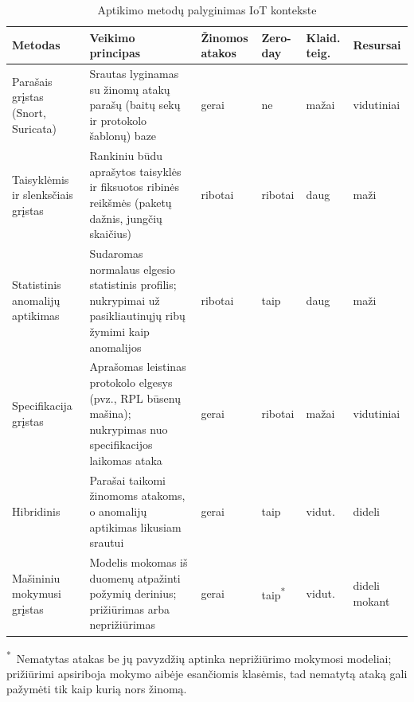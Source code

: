 \begin{table}[htbp]
\centering
\caption{Aptikimo metodų palyginimas IoT kontekste}
\label{tab:aptikimas}
\footnotesize
\setlength{\tabcolsep}{4pt}
\begin{tabularx}{\textwidth}{@{}
  >{\raggedright\arraybackslash}p{2.1cm}
  >{\raggedright\arraybackslash}X
  >{\centering\arraybackslash}p{1.5cm}
  >{\centering\arraybackslash}p{1.4cm}
  >{\centering\arraybackslash}p{1.5cm}
  >{\centering\arraybackslash}p{1.6cm}@{}}
\toprule
\textbf{Metodas} & \textbf{Veikimo principas} & \textbf{Žinomos atakos}
  & \textbf{Zero-day} & \textbf{Klaid. teig.} & \textbf{Resursai} \\
\midrule

Parašais grįstas (Snort, Suricata)
  & Srautas lyginamas su žinomų atakų parašų (baitų sekų ir
    protokolo šablonų) baze
  & gerai & ne & mažai & vidutiniai \\
\addlinespace

Taisyklėmis ir slenksčiais grįstas
  & Rankiniu būdu aprašytos taisyklės ir fiksuotos ribinės reikšmės
    (paketų dažnis, jungčių skaičius)
  & ribotai & ribotai & daug & maži \\
\addlinespace

Statistinis anomalijų aptikimas
  & Sudaromas normalaus elgesio statistinis profilis; nukrypimai už
    pasikliautinųjų ribų žymimi kaip anomalijos
  & ribotai & taip & daug & maži \\
\addlinespace

Specifikacija grįstas
  & Aprašomas leistinas protokolo elgesys (pvz., RPL būsenų mašina);
    nukrypimas nuo specifikacijos laikomas ataka
  & gerai & ribotai & mažai & vidutiniai \\
\addlinespace

Hibridinis
  & Parašai taikomi žinomoms atakoms, o anomalijų aptikimas likusiam
    srautui
  & gerai & taip & vidut. & dideli \\
\addlinespace

Mašininiu mokymusi grįstas
  & Modelis mokomas iš duomenų atpažinti požymių derinius; prižiūrimas
    arba neprižiūrimas
  & gerai & taip\textsuperscript{*} & vidut. & dideli
    mokant \\
\bottomrule
\end{tabularx}

\vspace{2pt}
\raggedright\footnotesize
\textsuperscript{*}~Nematytas atakas be jų pavyzdžių aptinka
neprižiūrimo mokymosi modeliai; prižiūrimi apsiriboja mokymo aibėje
esančiomis klasėmis, tad nematytą ataką gali pažymėti tik kaip kurią
nors žinomą.
\end{table}

